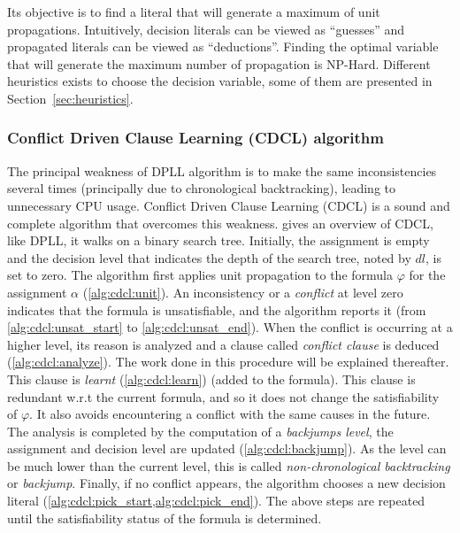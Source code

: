 Its objective is to find a literal that will generate a maximum of unit propagations.
Intuitively, decision literals can be viewed as “guesses” and propagated literals can be viewed as “deductions”. 
Finding the optimal variable that will generate the maximum number of propagation is NP-Hard\cite{biere2009handbook}.
Different heuristics exists to choose the decision variable, some of them are presented in Section~\ref{sec:heuristics}.
%
%
\subsubsection{Conflict Driven Clause Learning (CDCL) algorithm}\label{sec:cdcl}
The principal weakness of DPLL algorithm is to make the same inconsistencies several times
(principally due to chronological backtracking), leading to  unnecessary CPU usage.
Conflict Driven Clause Learning (CDCL) \cite{marques1999grasp} is a sound and complete algorithm
that overcomes this weakness.
 gives an overview of CDCL, like DPLL,  it walks on a binary search tree.
Initially, the  assignment is empty and the decision level that 
indicates the depth of the search tree, noted by $dl$, is set to zero.
The algorithm first applies unit propagation to the formula $\varphi$ for the  assignment $\alpha$ (\cref{alg:cdcl:unit}).
An inconsistency or a \emph{conflict} at level zero indicates that the formula is unsatisfiable, and the algorithm
reports it (from \cref{alg:cdcl:unsat_start} to \cref{alg:cdcl:unsat_end}). When the conflict is occurring at a higher level,
 its reason is analyzed and a clause called \emph{conflict clause} is deduced (\cref{alg:cdcl:analyze}).
The work done in this procedure will be explained thereafter.
This clause is \emph{learnt} (\cref{alg:cdcl:learn}) (added to the formula). This clause is redundant w.r.t the current
formula, and so it does not change the satisfiability of $\varphi$. It also avoids encountering a conflict with the same
causes in the future. %
The analysis is completed by the computation of a \emph{backjumps level}, the assignment and decision level are updated (\cref{alg:cdcl:backjump}).
 As the level can be much lower than the current level, this is called \emph{non-chronological backtracking} or \textit{backjump}.
Finally, if no conflict appears, the algorithm chooses a new decision literal 
(\cref{alg:cdcl:pick_start,alg:cdcl:pick_end}).
The above steps are repeated until the satisfiability status of the formula is determined.

